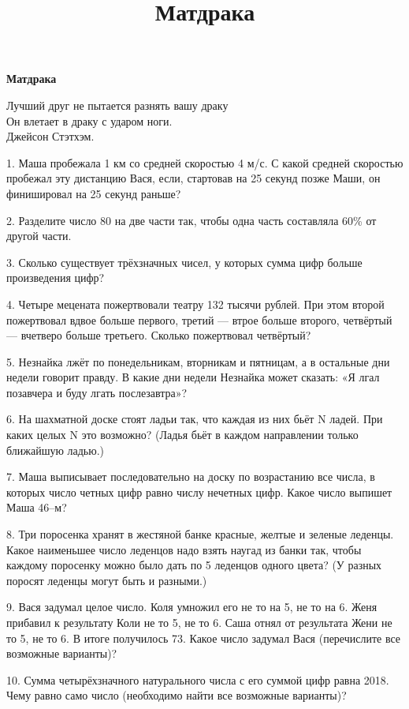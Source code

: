 \centerline{\bf \Huge  Матдрака}
\title{Матдрака}

\begin{flushright}
    \scriptsize Лучший друг не пытается разнять вашу драку\\
    Он влетает в драку с ударом ноги.\\
    Джейсон Стэтхэм.
\end{flushright}

1. Маша пробежала 1 км со средней скоростью 4 м/с. С какой средней скоростью пробежал эту дистанцию Вася, если, стартовав на 25 секунд позже Маши, он финишировал на 25 секунд раньше?

2. Разделите число 80 на две части так, чтобы одна часть составляла 60\% от другой части.

3. Сколько существует трёхзначных чисел, у которых сумма цифр больше произведения цифр?

4. Четыре мецената пожертвовали театру 132 тысячи рублей. При этом второй пожертвовал вдвое больше первого, третий — втрое больше второго, четвёртый — вчетверо больше третьего. Сколько пожертвовал четвёртый?

5. Незнайка лжёт по понедельникам, вторникам и пятницам, а в остальные дни недели говорит правду. В какие дни недели Незнайка может сказать: «Я лгал позавчера и буду лгать послезавтра»?

6. На шахматной доске стоят ладьи так, что каждая из них бьёт N ладей. При каких целых N это возможно? (Ладья бьёт в каждом направлении только ближайшую ладью.)

7. Маша выписывает последовательно на доску по возрастанию все числа, в которых число четных цифр равно числу нечетных цифр. Какое число выпишет Маша 46–м?

8. Три поросенка хранят в жестяной банке красные, желтые и зеленые леденцы. Какое наименьшее число леденцов надо взять наугад из банки так, чтобы каждому поросенку можно было дать по 5 леденцов одного цвета? (У разных поросят леденцы могут быть и разными.)

9. Вася задумал целое число. Коля умножил его не то на 5, не то на 6. Женя прибавил к результату Коли не то 5, не то 6. Саша отнял от результата Жени не то 5, не то 6. В итоге получилось 73. Какое число задумал Вася (перечислите все возможные варианты)?

10. Сумма четырёхзначного натурального числа с его суммой цифр равна 2018. Чему равно само число (необходимо найти все возможные варианты)?

\newpage

